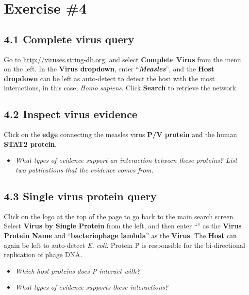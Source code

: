 \documentclass[a4paper]{article}
\begin{document}
\section*{Exercise \#4}

\vspace{0,5cm}

\subsection*{4.1 Complete virus query}

Go to \url{http://viruses.string-db.org}, and select \textbf{Complete Virus} from the menu on the left. In the \textbf{Virus dropdown}, enter “\textbf{\textit{Measles}}”, and the \textbf{Host dropdown} can be left as auto-detect to detect the host with the most interactions, in this case, \textit{Homo sapiens}. Click \textbf{Search} to retrieve the network.

\vspace{0,5cm}

\subsection*{4.2 Inspect virus evidence}
Click on the \textbf{edge} connecting the measles virus \textbf{P/V protein} and the human \textbf{STAT2 protein}.

\begin{itemize}
  \item \textit{What types of evidence support an interaction between these proteins? List two publications that the evidence comes from.}
\end{itemize}

\vspace{0,5cm}

\subsection*{4.3 Single virus protein query}
Click on the logo at the top of the page to go back to the main search screen. Select \textbf{Virus by Single Protein} from the left, and then enter “” as the \textbf{Virus Protein Name} and “\textbf{bacteriophage lambda}” as the \textbf{Virus}. The \textbf{Host} can again be left to auto-detect \textit{E. coli}. Protein P is responsible for the bi-directional replication of phage DNA.

\begin{itemize}
  \item \textit{Which host proteins does P interact with?}
  \item \textit{What types of evidence supports these interactions?}
\end{itemize}
\end{document}
